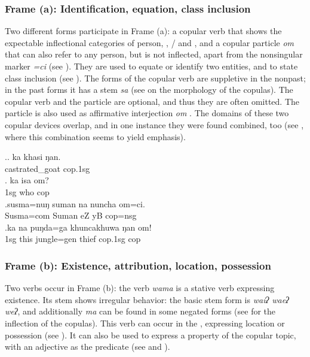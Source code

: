 \subsubsection{Frame (a): Identification, equation,  class inclusion}

Two different forms participate in Frame (a): a copular verb that shows the expectable inflectional categories of person, , / and , and a copular particle \emph{om} that can also refer to any person, but is not inflected, apart from the nonsingular marker \emph{=ci} (see \Next[c]). They are used to equate or identify two entities, and to state class inclusion (see \Next).  The forms of the copular verb are suppletive in the nonpast; in the past forms it has a stem \emph{sa} (see  on the morphology of the copulas). The copular verb and the particle are optional, and thus they are often omitted. The particle is also used as affirmative interjection \emph{om} .  The domains of these two copular devices overlap, and in one instance they were found combined, too (see \Next[d], where this combination seems to yield emphasis).
 
 \ex.\ag. ka khasi ŋan.\\
	 castrated\_goat  {\sc cop.1sg} \\
	 
\bg. ka isa om?\\
{\sc 1sg} who {\sc cop}\\
\bg.susma=nuŋ    suman  na           nuncha           om=ci.\\
Susma{\sc =com} Suman eZ yB {\sc cop=nsg}\\
 
\bg.ka  na   puŋda=ga    khuncakhuwa ŋan    om!\\
{\sc 1sg} this jungle{\sc =gen} thief  {\sc cop.1sg} {\sc cop}\\
 


\subsubsection{Frame (b): Existence, attribution, location, possession}

Two verbs occur in Frame (b): the verb  \emph{wama}   is a stative verb expressing existence.  Its stem shows irregular behavior: the basic stem form is \emph{waiʔ \ti waeʔ \ti weʔ}, and additionally \emph{ma} can be found in some negated forms (see  for the inflection of the copulas). This verb can occur in the , expressing location or possession (see \Next[a]). It can also be used to express a property of the copular topic, with an adjective as the predicate (see \Next[b] and \Next[c]).

